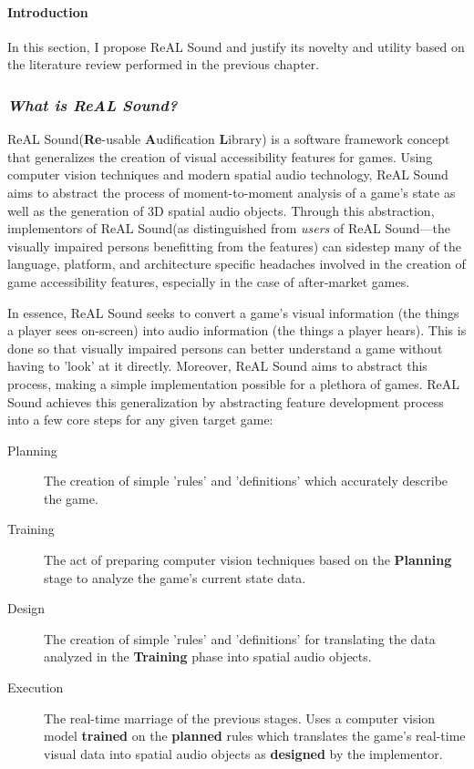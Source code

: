 \documentclass{report}
\newcommand{\rs}{ReAL Sound\xspace}
\newcommand{\rsfull}{\textbf{Re}-usable \textbf{A}udification \textbf{L}ibrary\xspace}
\begin{document}
\paragraph{Introduction} 

In this section, I propose \rs and justify its novelty and utility based on the literature review performed in the previous chapter.

\subsubsection{\emph{What is \rs?}}
\rs (\rsfull) is a software framework concept that generalizes the creation of visual accessibility features for games. Using computer vision techniques and modern spatial audio technology, \rs aims to abstract the process of moment-to-moment analysis of a game's state as well as the generation of 3D spatial audio objects. Through this abstraction, implementors of \rs (as distinguished from \emph{users} of \rs---the visually impaired persons benefitting from the features) can sidestep many of the language, platform, and architecture specific headaches involved in the creation of game accessibility features, especially in the case of after-market games. 

In essence, \rs seeks to convert a game's visual information (the things a player sees on-screen) into audio information (the things a player hears). This is done so that visually impaired persons can better understand a game without having to 'look' at it directly. Moreover, \rs aims to abstract this process, making a simple implementation possible for a plethora of games. \rs achieves this generalization by abstracting feature development process into a few core steps for any given target game:

\begin{description}
    \item [Planning] The creation of simple 'rules' and 'definitions' which accurately describe the game.
    \item [Training] The act of preparing computer vision techniques based on the \textbf{Planning} stage to analyze the game's current state data.
    \item [Design] The creation of simple 'rules' and 'definitions' for translating the data analyzed in the \textbf{Training} phase into spatial audio objects. 
    \item [Execution] The real-time marriage of the previous stages. Uses a computer vision model \textbf{trained} on the \textbf{planned} rules which translates the game's real-time visual data into spatial audio objects as \textbf{designed} by the implementor.    
\end{description}
\end{document}
